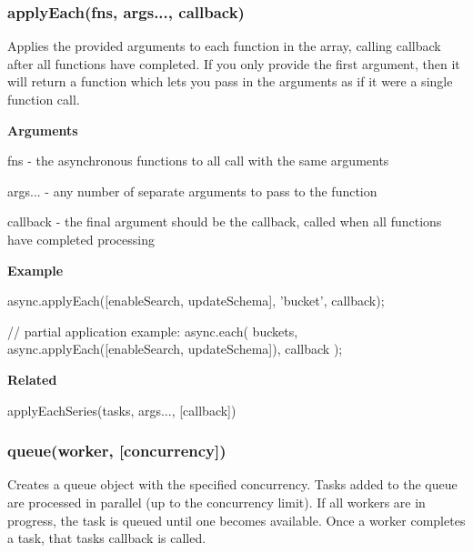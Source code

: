  \label{_applyEach}%
 \subsubsection*{apply\+Each(fns, args..., callback)}

Applies the provided arguments to each function in the array, calling {\ttfamily callback} after all functions have completed. If you only provide the first argument, then it will return a function which lets you pass in the arguments as if it were a single function call.

{\bfseries Arguments}


\begin{DoxyItemize}
\item {\ttfamily fns} -\/ the asynchronous functions to all call with the same arguments
\item {\ttfamily args...} -\/ any number of separate arguments to pass to the function
\item {\ttfamily callback} -\/ the final argument should be the callback, called when all functions have completed processing
\end{DoxyItemize}

{\bfseries Example}


\begin{DoxyCode}
async.applyEach([enableSearch, updateSchema], 'bucket', callback);

// partial application example:
async.each(
    buckets,
    async.applyEach([enableSearch, updateSchema]),
    callback
);
\end{DoxyCode}


{\bfseries Related}


\begin{DoxyItemize}
\item apply\+Each\+Series(tasks, args..., \mbox{[}callback\mbox{]}) 


\end{DoxyItemize}

\label{_queue}%
 \subsubsection*{queue(worker, \mbox{[}concurrency\mbox{]})}

Creates a {\ttfamily queue} object with the specified {\ttfamily concurrency}. Tasks added to the {\ttfamily queue} are processed in parallel (up to the {\ttfamily concurrency} limit). If all {\ttfamily worker}s are in progress, the task is queued until one becomes available. Once a {\ttfamily worker} completes a {\ttfamily task}, that {\ttfamily task}\textquotesingle{}s callback is called.

